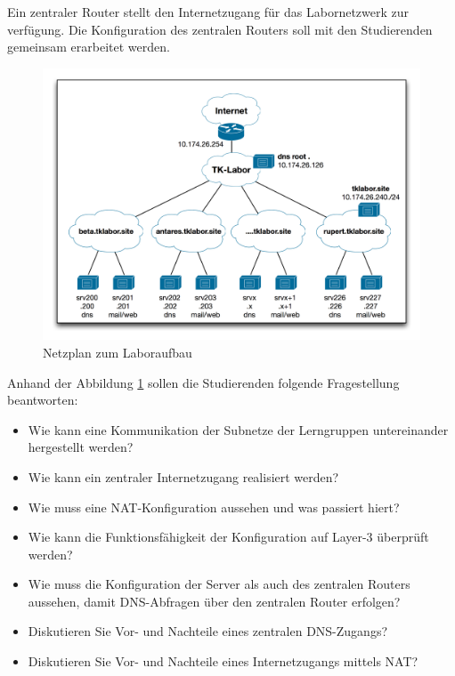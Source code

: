 \newline
\newline
Ein zentraler Router stellt den Internetzugang für das Labornetzwerk zur
verfügung. Die Konfiguration des zentralen Routers soll mit den Studierenden
gemeinsam erarbeitet werden.

\begin{figure}[H]
 	\centering
 		\includegraphics[width=1.0\textwidth]{images/lab-netzplan.png}
 		\caption{Netzplan zum Laboraufbau}
 	\label{fig:chap-labdocu-netzplan}
\end{figure}

Anhand der Abbildung \ref{fig:chap-labdocu-netzplan} sollen die Studierenden
folgende Fragestellung beantworten:

\begin{itemize}
  \item Wie kann eine Kommunikation der Subnetze der Lerngruppen untereinander
  hergestellt werden?
  \item Wie kann ein zentraler Internetzugang realisiert werden? 
  \item Wie muss eine NAT-Konfiguration aussehen und was passiert hiert?
  \item Wie kann die Funktionsfähigkeit der Konfiguration auf Layer-3 überprüft
  werden?
  \item Wie muss die Konfiguration der Server als auch des zentralen Routers
  aussehen, damit DNS-Abfragen über den zentralen Router erfolgen?
  \item Diskutieren Sie Vor- und Nachteile eines zentralen DNS-Zugangs?
  \item Diskutieren Sie Vor- und Nachteile eines Internetzugangs mittels NAT? 
\end{itemize}

